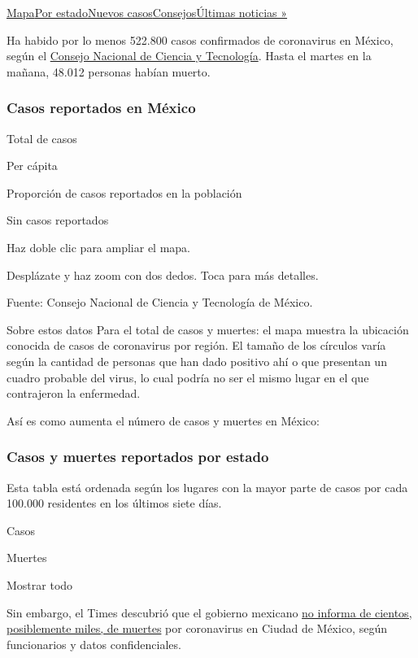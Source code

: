 \protect\hyperlink{map}{Mapa}\protect\hyperlink{states}{Por
estado}\protect\hyperlink{cases}{Nuevos
casos}\protect\hyperlink{tips}{Consejos}\href{https://www.nytimes.com/2020/08/03/world/coronavirus-covid-19.html}{Últimas
noticias »}

Ha habido por lo menos 522.800 casos confirmados de coronavirus en
México, según el \href{https://coronavirus.gob.mx/datos/}{Consejo
Nacional de Ciencia y Tecnología}. Hasta el martes en la mañana, 48.012
personas habían muerto.

\hypertarget{casos-reportados-en-muxe9xico}{%
\subsubsection{Casos reportados en
México}\label{casos-reportados-en-muxe9xico}}

Total de casos

Per cápita

Proporción de casos reportados en la población

Sin casos reportados

Haz doble clic para ampliar el mapa.

Desplázate y haz zoom con dos dedos. Toca para más detalles.

Fuente: Consejo Nacional de Ciencia y Tecnología de México.

Sobre estos datos Para el total de casos y muertes: el mapa muestra la
ubicación conocida de casos de coronavirus por región. El tamaño de los
círculos varía según la cantidad de personas que han dado positivo ahí o
que presentan un cuadro probable del virus, lo cual podría no ser el
mismo lugar en el que contrajeron la enfermedad.

Así es como aumenta el número de casos y muertes en México:

\hypertarget{casos-y-muertes-reportados-por-estado}{%
\subsubsection{Casos y muertes reportados por
estado}\label{casos-y-muertes-reportados-por-estado}}

Esta tabla está ordenada según los lugares con la mayor parte de casos
por cada 100.000 residentes en los últimos siete días.

Casos

Muertes

Mostrar todo

Sin embargo, el Times descubrió que el gobierno mexicano
\href{https://www.nytimes.com/es/2020/05/08/espanol/america-latina/mexico-coronavirus.html}{no
informa de cientos, posiblemente miles, de muertes} por coronavirus en
Ciudad de México, según funcionarios y datos confidenciales.

